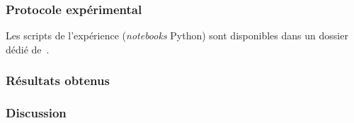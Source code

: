 		\subsubsection{Protocole expérimental}
		

			\begin{leftBarInformation}
				Les scripts de l'expérience (\textit{notebooks} Python) sont disponibles dans un dossier dédié de~\cite{schild:cognitivefactory-interactive-clustering-comparative-study:2021}.
			\end{leftBarInformation}

		\subsubsection{Résultats obtenus}

		\subsubsection{Discussion}